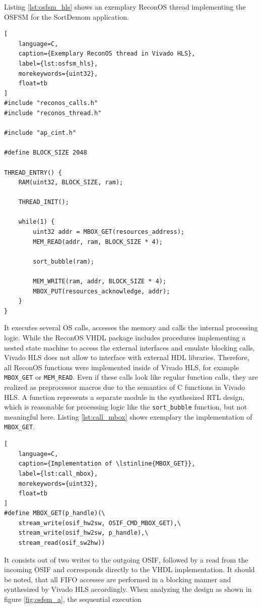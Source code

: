 Listing \ref{lst:osfsm_hls} shows an exemplary ReconOS thread implementing the
\ac{OSFSM} for the SortDemom application.
\begin{lstlisting}[
	language=C,
	caption={Exemplary ReconOS thread in Vivado HLS},
	label={lst:osfsm_hls},
	morekeywords={uint32},
	float=tb
]
#include "reconos_calls.h"
#include "reconos_thread.h"

#include "ap_cint.h"

#define BLOCK_SIZE 2048

THREAD_ENTRY() {
	RAM(uint32, BLOCK_SIZE, ram);

	THREAD_INIT();

	while(1) {
		uint32 addr = MBOX_GET(resources_address);
		MEM_READ(addr, ram, BLOCK_SIZE * 4);

		sort_bubble(ram);

		MEM_WRITE(ram, addr, BLOCK_SIZE * 4);
		MBOX_PUT(resources_acknowledge, addr);
	}
}
\end{lstlisting}
It executes several \ac{OS} calls, accesses the memory and calls the internal
processing logic. While the ReconOS \ac{VHDL} package includes procedures
implementing a nested state machine to access the external interfaces and
emulate blocking calls, Vivado HLS does not allow to interface with external
\ac{HDL} libraries. Therefore, all ReconOS functions were implemented inside
of Vivado HLS, for example \lstinline{MBOX_GET} or \lstinline{MEM_READ}. Even
if these calls look like regular function calls, they are realized as
preprocessor macros due to the semantics of C functions in Vivado HLS. A
function represents a separate module in the synthesized \ac{RTL} design,
which is reasonable for processing logic like the \lstinline{sort_bubble}
function, but not meaningful here. Listing \ref{lst:call_mbox} shows exemplary
the implementation of \lstinline{MBOX_GET}.
\begin{lstlisting}[
	language=C,
	caption={Implementation of \lstinline{MBOX_GET}},
	label={lst:call_mbox},
	morekeywords={uint32},
	float=tb
]
#define MBOX_GET(p_handle)(\
	stream_write(osif_hw2sw, OSIF_CMD_MBOX_GET),\
	stream_write(osif_hw2sw, p_handle),\
	stream_read(osif_sw2hw))
\end{lstlisting}
It consists out of two writes to the outgoing \ac{OSIF}, followed by a read
from the incoming \ac{OSIF} and corresponds directly to the \ac{VHDL}
implementation. It should be noted, that all \ac{FIFO} accesses are performed
in a blocking manner and synthesized by Vivado HLS accordingly. When analyzing
the design as shown in figure \ref{fig:osfsm_a}, the sequential execution
